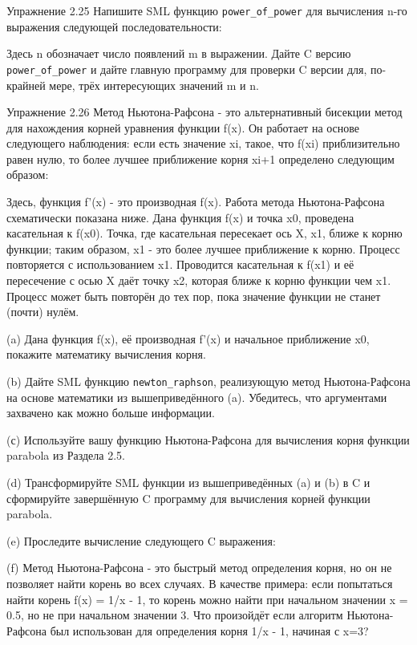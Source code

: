 Упражнение 2.25 Напишите SML функцию \lstinline|power_of_power| для вычисления n-го выражения следующей последовательности:

Здесь n обозначает число появлений m в выражении. Дайте C версию \lstinline|power_of_power| и дайте главную программу для проверки C версии для, по-крайней мере, трёх интересующих значений m и n.

Упражнение 2.26 Метод Ньютона-Рафсона - это альтернативный бисекции метод для нахождения корней уравнения функции f(x). Он работает на основе следующего наблюдения: если есть значение xi, такое, что f(xi) приблизительно равен нулю, то более лучшее приближение корня xi+1 определено следующим образом:

Здесь, функция f'(x) - это производная f(x). Работа метода Ньютона-Рафсона схематически показана ниже. Дана функция f(x) и точка x0, проведена касательная к f(x0). Точка, где касательная пересекает ось X, x1, ближе к корню функции; таким образом, x1 - это более лучшее приближение к корню. Процесс повторяется с использованием x1. Проводится касательная к f(x1) и её пересечение с осью X даёт точку x2, которая ближе к корню функции чем x1. Процесс может быть повторён до тех пор, пока значение функции не станет (почти) нулём.

(a) Дана функция f(x), её производная f'(x) и начальное приближение x0, покажите математику вычисления корня.

(b) Дайте SML функцию \lstinline|newton_raphson|, реализующую метод Ньютона-Рафсона на основе математики из вышеприведённого (a). Убедитесь, что аргументами захвачено как можно больше информации.

(с) Используйте вашу функцию Ньютона-Рафсона для вычисления корня функции parabola из Раздела 2.5.

(d) Трансформируйте SML функции из вышеприведённых (a) и (b) в C и сформируйте завершённую C программу для вычисления корней функции parabola.

(e) Проследите вычисление следующего C выражения:

(f) Метод Ньютона-Рафсона - это быстрый метод определения корня, но он не позволяет найти корень во всех случаях. В качестве примера: если попытаться найти корень f(x) = 1/x - 1, то корень можно найти при начальном значении x = 0.5, но не при начальном значении 3. Что произойдёт если алгоритм Ньютона-Рафсона был использован для определения корня 1/x - 1, начиная с x=3?

